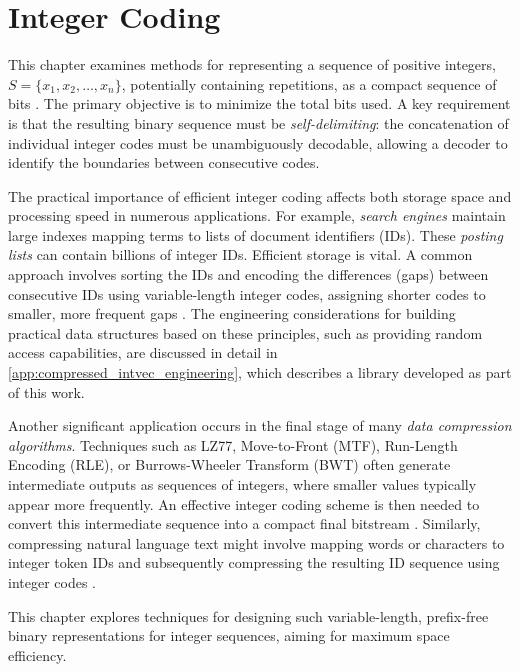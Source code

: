 \clearpage
\section{Integer Coding} \label{sec:integer_coding}

\noindent This chapter examines methods for representing a sequence of positive integers, $S = \{x_1, x_2, \ldots, x_n\}$, potentially containing repetitions, as a compact sequence of bits \cite{ferragina2023pearls}. The primary objective is to minimize the total bits used. A key requirement is that the resulting binary sequence must be \emph{self-delimiting}: the concatenation of individual integer codes must be unambiguously decodable, allowing a decoder to identify the boundaries between consecutive codes.

\noindent The practical importance of efficient integer coding affects both storage space and processing speed in numerous applications. For example, \emph{search engines} maintain large indexes mapping terms to lists of document identifiers (IDs). These \emph{posting lists} can contain billions of integer IDs. Efficient storage is vital. A common approach involves sorting the IDs and encoding the differences (gaps) between consecutive IDs using variable-length integer codes, assigning shorter codes to smaller, more frequent gaps \cite{ferragina2023pearls, witten1999managing}. The engineering considerations for building practical data structures based on these principles, such as providing random access capabilities, are discussed in detail in \autoref{app:compressed_intvec_engineering}, which describes a library developed as part of this work.

\noindent Another significant application occurs in the final stage of many \emph{data compression algorithms}. Techniques such as LZ77, Move-to-Front (MTF), Run-Length Encoding (RLE), or Burrows-Wheeler Transform (BWT) often generate intermediate outputs as sequences of integers, where smaller values typically appear more frequently. An effective integer coding scheme is then needed to convert this intermediate sequence into a compact final bitstream \cite{ferragina2023pearls}. Similarly, compressing natural language text might involve mapping words or characters to integer token IDs and subsequently compressing the resulting ID sequence using integer codes \cite{ferragina2023pearls}.

\noindent This chapter explores techniques for designing such variable-length, prefix-free binary representations for integer sequences, aiming for maximum space efficiency.


